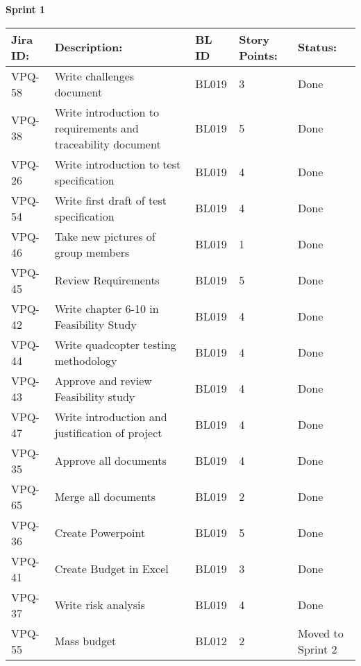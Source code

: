 \begin{table}[ht]
\centering\textbf{Sprint 1}
\begin{tabularx}{\linewidth}{|m{1.5cm} m{6.65cm} m{1.2cm} m{1.5cm} m{3.5cm}|}
\hline
    \rowcolor{cadetgrey} 
     \textbf{Jira ID:} & \textbf{Description:} & \textbf{BL ID} & \textbf{Story Points:} & \textbf{Status: } \\ \hline
      VPQ-58 & Write challenges document & BL019 & 3\centering & Done \\ 
\rowcolor{gainsboro} VPQ-38 & Write introduction to requirements and traceability document & BL019 & 5\centering & Done  \\

              VPQ-26 & Write introduction to test specification & BL019  & 4\centering & Done  \\
\rowcolor{gainsboro}VPQ-54 & Write first draft of test specification & BL019 & 4\centering & Done  \\
            VPQ-46 & Take new pictures of group members & BL019 & 1\centering & Done  \\
\rowcolor{gainsboro} VPQ-45 & Review Requirements & BL019 & 5\centering & Done  \\
              VPQ-42 & Write chapter 6-10 in Feasibility Study & BL019 & 4\centering & Done  \\
\rowcolor{gainsboro} VPQ-44 & Write quadcopter testing methodology & BL019 & 4\centering & Done  \\    
            VPQ-43 & Approve and review Feasibility study & BL019 & 4\centering & Done  \\
\rowcolor{gainsboro}  VPQ-47 & Write introduction and justification of project & BL019 & 4\centering & Done  \\
            VPQ-35 & Approve all documents & BL019 & 4\centering & Done  \\
\rowcolor{gainsboro}  VPQ-65 & Merge all documents & BL019 & 2\centering & Done \\
            VPQ-36 & Create Powerpoint & BL019 & 5\centering & Done  \\
\rowcolor{gainsboro}  VPQ-41 & Create Budget in Excel & BL019 & 3\centering & Done  \\
            VPQ-37 & Write risk analysis & BL019 & 4\centering & Done  \\
\rowcolor{gainsboro}  VPQ-55 & Mass budget & BL012 & 2\centering & Moved to Sprint 2  \\

\end{tabularx}
\end{table}
